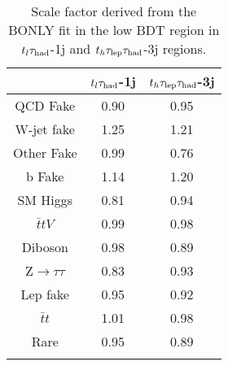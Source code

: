 \begin{table}
\begin{center} 
\begin{tabular}{ccc}\toprule\toprule
& $t_l\tau_\text{had}$-1j & $t_h\tau_\text{lep}{}\tau_\text{had}$-3j \\\midrule
  QCD Fake                 & 0.90  & 0.95 \\
  W-jet fake               & 1.25  & 1.21 \\
  Other Fake               & 0.99  & 0.76 \\
  b Fake                   & 1.14  & 1.20 \\
  SM Higgs                 & 0.81  & 0.94 \\
  $\bar{t}tV$              & 0.99  & 0.98 \\
  Diboson                  & 0.98  & 0.89 \\
  Z$\rightarrow \tau\tau$  & 0.83  & 0.93 \\
  Lep fake                 & 0.95  & 0.92 \\
  $\bar{t}t$               & 1.01  & 0.98 \\
  Rare                     & 0.95  & 0.89 \\
\bottomrule\bottomrule\\
\end{tabular} 
\caption{Scale factor derived from the BONLY fit in the low BDT region in $t_l\tau_\text{had}$-1j and $t_h\tau_\text{lep}{}\tau_\text{had}$-3j regions.} 
\label{tab:tthML_rescaled_factor}
\end{center} 
\end{table}



